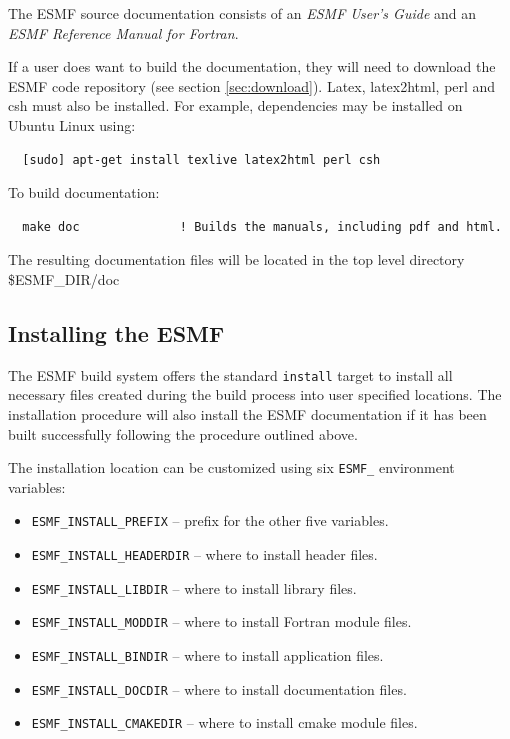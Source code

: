 The ESMF source documentation consists of an {\it ESMF User's Guide}
and an {\it ESMF Reference Manual for Fortran}.

If a user does want to build the documentation, they will need to download the
ESMF code repository (see section \ref{sec:download}). Latex, latex2html, perl
and csh must also be installed. For example, dependencies may be installed on
Ubuntu Linux using:
\begin{verbatim}
  [sudo] apt-get install texlive latex2html perl csh
\end{verbatim}

\noindent To build documentation:
\begin{verbatim}
  make doc              ! Builds the manuals, including pdf and html.
\end{verbatim}

\noindent The resulting documentation files will be
located in the top level directory \${ESMF\_DIR}/doc

\subsection{Installing the ESMF}
\label{InstallESMF}

The ESMF build system offers the standard {\tt install} target to install all
necessary files created during the build process into user specified locations.
The installation procedure will also install the ESMF documentation if it has
been built successfully following the procedure outlined above.

The installation location can be customized using six {\tt ESMF\_} environment
variables:
\begin{itemize}
\item {\tt ESMF\_INSTALL\_PREFIX} -- prefix for the other five variables.
\item {\tt ESMF\_INSTALL\_HEADERDIR} -- where to install header files.
\item {\tt ESMF\_INSTALL\_LIBDIR} -- where to install library files.
\item {\tt ESMF\_INSTALL\_MODDIR} -- where to install Fortran module files.
\item {\tt ESMF\_INSTALL\_BINDIR} -- where to install application files.
\item {\tt ESMF\_INSTALL\_DOCDIR} -- where to install documentation files.
\item {\tt ESMF\_INSTALL\_CMAKEDIR} -- where to install cmake module files.
\end{itemize}


